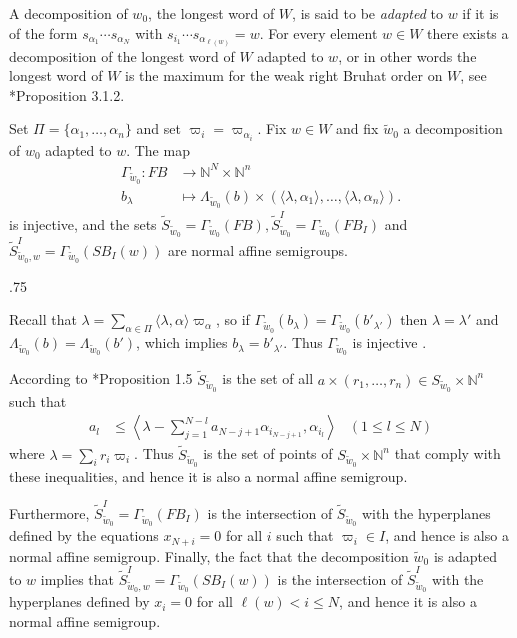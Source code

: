 \documentclass[11pt,fleqn]{article}
\makeatletter
\renewenvironment{proof}[1][\textit{Proof}]{\par
  \pushQED{\qed}%
  \normalfont \topsep.75\paraskip\relax
  \trivlist
  \item[\hskip\labelsep
        \itshape
    #1\@addpunct{.}]\ignorespaces
}{%
  \popQED\endtrivlist\@endpefalse
}
\newcommand\NN{\mathbb N}
\renewcommand\to{\longrightarrow}
\newcommand\GG{\Gamma}
\newcommand\flagbasis{FB}
\newcommand\schubertbasis{SB}
\makeatother
\begin{document}
A decomposition of $w_0$, the longest word of $W$, is said to be \emph{adapted}
to $w$ if it is of the form $s_{\alpha_1} \cdots s_{\alpha_N}$ with $s_{i_1} 
\cdots s_{\alpha_{\ell(w)}} = w$. For every element $w \in W$ there exists a 
decomposition of the longest word of $W$ adapted to $w$, or in other words the 
longest word of $W$ is the maximum for the weak right Bruhat order on $W$, see 
\cite{BB}*{Proposition 3.1.2}. 
\begin{Lemma*}
Set $\Pi = \{\alpha_1, \ldots, \alpha_n\}$ and set $\varpi_i = 
\varpi_{\alpha_i}$. Fix $w \in W$ and fix $\tilde w_0$ a decomposition of 
$w_0$ adapted to $w$. The map
\begin{align*}
\Gamma_{\tilde w_0}:
   FB &\to \NN^{N} \times \NN^n \\
   b_\lambda & \longmapsto \Lambda_{\tilde w_0}(b) \times 
   (\langle \lambda, \alpha_1 \rangle, \ldots, \langle \lambda, \alpha_n 
   \rangle).
\end{align*}
is injective, and the sets $\tilde S_{\tilde w_0} = 
\GG_{\tilde w_0}(\flagbasis), \tilde S_{\tilde w_0}^I = 
\GG_{\tilde w_0}(\flagbasis_I)$ and $\tilde S_{\tilde w_0, w}^I = 
\GG_{\tilde w_0}(\schubertbasis_I(w))$ are normal affine semigroups.
\end{Lemma*}
\begin{proof}
Recall that $\lambda = \sum_{\alpha \in \Pi} \langle \lambda, \alpha \rangle 
\varpi_\alpha$, so if $\Gamma_{\tilde w_0}(b_\lambda) = 
\Gamma_{\tilde w_0}(b'_{\lambda'})$ then $\lambda = \lambda'$ and 
$\Lambda_{\tilde w_0}(b) = \Lambda_{\tilde w_0}(b')$, which implies 
$b_\lambda = b'_{\lambda'}$. Thus $\Gamma_{\tilde w_0}$ is injective .

According to \cite{Lit}*{Proposition 1.5} $
\tilde S_{\tilde w_0}$  is the set of all $a \times (r_1, \ldots, r_n) \in 
S_{\tilde w_0} \times \NN^n$ such that
\begin{align*}
a_l 
  &\leq \left\langle \lambda - \sum_{j=1}^{N-l} a_{N-j+1} \alpha_{i_{N-j+1}}, 
  \alpha_{i_l} \right\rangle
& (1 \leq l \leq N)
\end{align*}
where $\lambda = \sum_i r_i \varpi_i$. Thus $\tilde S_{\tilde w_0}$ is the set 
of points of $S_{\tilde w_0} \times \NN^n$ that comply with these 
inequalities, and hence it is also a normal affine semigroup. 

Furthermore, $\tilde S_{\tilde w_0}^I = \Gamma_{\tilde w_0}(\flagbasis_I)$ is 
the intersection of $\tilde S_{\tilde w_0}$ with the hyperplanes defined by 
the equations $x_{N+i} = 0$ for all $i$ such that $\varpi_i \in I$, and hence 
is also a normal affine semigroup. Finally, the fact that the decomposition 
$\tilde w_0$ is adapted to $w$ implies that 
$\tilde S_{\tilde w_0, w}^I = \Gamma_{\tilde w_0}(\schubertbasis_I(w))$ is the 
intersection of $\tilde S_{\tilde w_0}^I$ with the hyperplanes defined by 
$x_i = 0$ for all $\ell(w) < i \leq N$, and hence it is also a normal affine 
semigroup. 
\end{proof}
\end{document}
